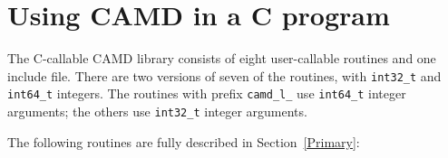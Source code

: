 \documentclass[11pt]{article}
\begin{document}
\section{Using CAMD in a C program}
\label{Cversion}

The C-callable CAMD library consists of eight user-callable routines and one
include file.  There are two versions of seven of the routines, with
\verb'int32_t' and \verb'int64_t' integers.
The routines with prefix
{\tt camd\_l\_} use \verb'int64_t' integer arguments; the others use
\verb'int32_t' integer arguments.

The following routines are fully described in Section~\ref{Primary}:
\end{document}
